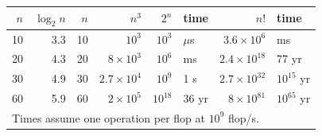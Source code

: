 \documentclass[border=6pt]{standalone}
\begin{document}
\begin{tabular}{r r r r r l r l}
  \toprule
  $n$ & $\log_2 n$ & $n$ & $n^3$ & $2^n$ & time & $n!$ & time \\
  \midrule
  10 & 3.3 & 10 & $10^3$            & $10^3$    & $\mu$s     & $3.6 \times 10^{6}$  & ms \\
  20 & 4.3 & 20 & $8 \times 10^3$   & $10^6$    & ms         & $2.4 \times 10^{18}$ & 77 yr \\
  30 & 4.9 & 30 & $2.7 \times 10^4$ & $10^9$    & 1 s        & $2.7 \times 10^{32}$ & $10^{15}$ yr \\
  60 & 5.9 & 60 & $2 \times 10^5$   & $10^{18}$ & 36 yr      & $8 \times 10^{81}$   & $10^{65}$ yr \\
  \bottomrule
  \multicolumn{8}{l}{\footnotesize Times assume one operation per flop at $10^9$ flop/s.}
\end{tabular}
\end{document}
